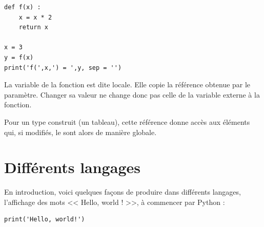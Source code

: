 \begin{multicols}{2}
\begin{verbatim}
def f(x) :
    x = x * 2
    return x

x = 3
y = f(x)
print('f(',x,') = ',y, sep = '')
\end{verbatim}

La variable  de la fonction est dite locale. Elle copie la référence obtenue par le paramètre. Changer sa valeur ne change donc pas celle de la variable  externe à la fonction.

Pour un type construit (un tableau), cette référence donne accès aux éléments qui, si modifiés, le sont alors de manière globale.

\end{multicols}

\chapter{Différents langages}

En introduction, voici quelques façons de produire dans différents langages, l'affichage des mots << Hello, world ! >>, à commencer par Python :

\vspace{-2ex}
\begin{verbatim}
print('Hello, world!')
\end{verbatim}

